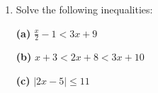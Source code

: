 \documentclass{amsart}
\begin{document}
\begin{enumerate}[1.]
{\bf (a)} $x^2(4(x-2)^3)+2x(x-4)^4$

\vspace{.8in}

{\bf (b)} $\dfrac{(x^2+3)^2(6)-6x(2)(x^2+3)(2x)}{(x^2+3)^4}$

\vspace{.8in}

{\bf (c)} $\dfrac{\frac{1}{x^2}-\frac{1}{9}}{x-3}$

\vspace{.8in}

{\bf (d)} $\dfrac{\sqrt{25+x^2}-x(1/2)(25+x^2)^{-1/2}(2x)}{25+x^2}$

\vspace{.8in}

\item Solve the following inequalities:

{\bf (a)} $\frac{x}{2}-1<3x+9$

\vspace{1in}

{\bf (b)} $x+3<2x+8<3x+10$

\vspace{1in}

{\bf (c)} $\vert 2x-5\vert\leq11$









\end{enumerate}
\end{document}
